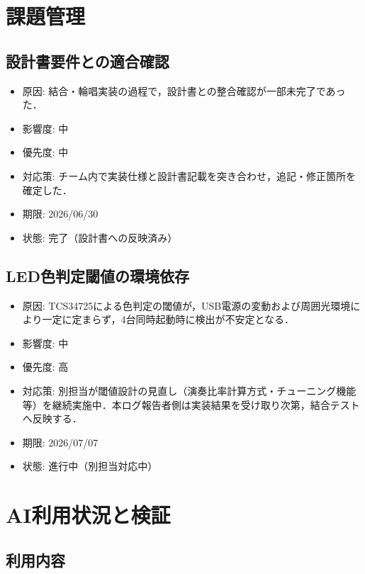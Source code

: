 \documentclass[lualatex,paper=a4paper,jafontsize=11.5pt,jafontscale=1.05]{jlreq}
\begin{document}
\section{課題管理}\label{sec:issues}

\subsection{設計書要件との適合確認}
\begin{itemize}
  \item 原因: 結合・輪唱実装の過程で，設計書との整合確認が一部未完了であった．
  \item 影響度: 中
  \item 優先度: 中
  \item 対応策: チーム内で実装仕様と設計書記載を突き合わせ，追記・修正箇所を確定した．
  \item 期限: 2026/06/30
  \item 状態: 完了（設計書への反映済み）
\end{itemize}

\subsection{LED色判定閾値の環境依存}
\begin{itemize}
  \item 原因: TCS34725による色判定の閾値が，USB電源の変動および周囲光環境により一定に定まらず，4台同時起動時に検出が不安定となる．
  \item 影響度: 中
  \item 優先度: 高
  \item 対応策: 別担当が閾値設計の見直し（演奏比率計算方式・チューニング機能等）を継続実施中．本ログ報告者側は実装結果を受け取り次第，結合テストへ反映する．
  \item 期限: 2026/07/07
  \item 状態: 進行中（別担当対応中）
\end{itemize}

\section{AI利用状況と検証}
\subsection{利用内容}
\end{document}
